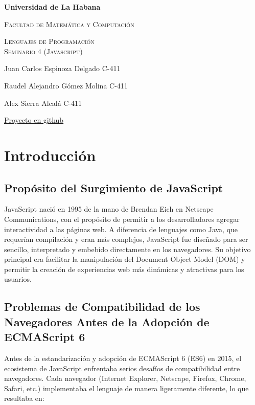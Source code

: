 \documentclass{article}
\begin{document}
\begin{titlepage}
    \centering
    {\bfseries\LARGE Universidad de La Habana \par}
    \vspace{1cm}
    {\scshape\Large Facultad de Matemática y Computación \par}
    \vspace{3cm}
    {\scshape\Huge Lenguajes de Programación\\ Seminario 4 (Javascript) \par}
    \vfill

    {\Large Juan Carlos Espinoza Delgado C-411 \par}
    {\Large Raudel Alejandro Gómez Molina C-411 \par}
    {\Large Alex Sierra Alcalá C-411 \par}
    \vfill
    {\href{https://github.com/ARJ-Code/js-lp}{Proyecto en github} \par}
\end{titlepage}

\section*{Introducción}

\subsection*{Propósito del Surgimiento de JavaScript}

JavaScript nació en 1995 de la mano de Brendan Eich en Netscape Communications, con el propósito de permitir a los
desarrolladores agregar interactividad a las páginas web. A diferencia de lenguajes como Java, que requerían
compilación y eran más complejos, JavaScript fue diseñado para ser sencillo, interpretado y embebido directamente en
los navegadores. Su objetivo principal era facilitar la manipulación del Document Object Model (DOM) y permitir la
creación de experiencias web más dinámicas y atractivas para los usuarios.

\subsection*{Problemas de Compatibilidad de los Navegadores Antes de la Adopción de ECMAScript 6}

Antes de la estandarización y adopción de ECMAScript 6 (ES6) en 2015, el ecosistema de JavaScript enfrentaba serios
desafíos de compatibilidad entre navegadores. Cada navegador (Internet Explorer, Netscape, Firefox, Chrome, Safari,
etc.) implementaba el lenguaje de manera ligeramente diferente, lo que resultaba en:
\end{document}
